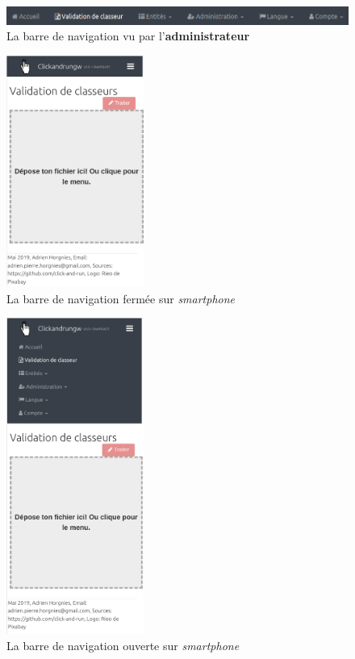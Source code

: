 \begin{figure}[ht]
    \centering
    \includegraphics[width=1\textwidth]{images/screenshot/navbar-admin.png}
    \caption{La barre de navigation vu par l'\textbf{administrateur}}
    \label{fig:navbar-admin}
\end{figure}

\begin{figure}[ht]
    \centering
    \includegraphics[width=0.4\textwidth]{images/screenshot/navbar-hamburger-closed.png}
    \caption{La barre de navigation fermée sur \textit{smartphone}}
    \label{fig:navbar-hamburger-closed}
\end{figure}

\begin{figure}[ht]
    \centering
    \includegraphics[width=0.4\textwidth]{images/screenshot/navbar-hamburger-open.png}
    \caption{La barre de navigation ouverte sur \textit{smartphone}}
    \label{fig:navbar-hamburger-opened}
\end{figure}

